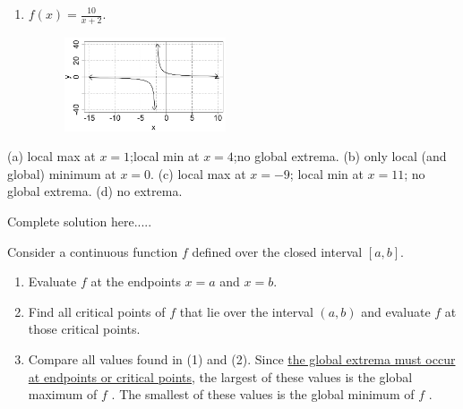 \begin{example}
\begin{enumerate}[leftmargin=*]
\begin{figure}[h!]
        \label{fig:exampleGraph4}
    \end{figure}
     \vspace{1in}
    \item $f(x)=\displaystyle\frac{10}{x+2}$. %
    \begin{figure}[h!]
        \includegraphics[width=0.45\textwidth,inner]{images/optimization/exampleGraph5.png}
        \label{fig:exampleGraph5}
    \end{figure}
     \vspace{1in}
\end{enumerate}
    \begin{sol}
    (a) local max at $x=1$;local min at $x=4$;no global extrema. (b) only local (and global) minimum at $x=0$. (c) local max at $x=-9$; local min at $x=11$; no global extrema. (d) no extrema.
    \end{sol}
    \begin{solL}
    Complete solution here.....
    
    \end{solL}
    
\end{example}

\begin{tcolorbox}[title={Steps For Locating Global Extrema Over A Closed Interval}]
Consider a continuous function $f$ defined over the closed interval $[a, b]$.
\begin{enumerate}
    \item Evaluate $f$ at the endpoints $x=a$ and $x=b$.
    \item Find all critical points of $f$ that lie over the interval $(a,b)$ and evaluate $f$ at those critical points.
    \item Compare all values found in (1) and (2). Since \underline{the global extrema must occur at endpoints or critical points}, the largest of these values is the global maximum of $f$ . The smallest of these values is the global minimum of $f$ .
\end{enumerate}
\end{tcolorbox}

